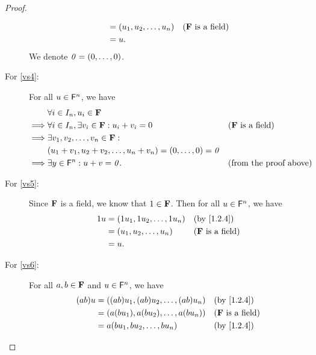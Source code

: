 \begin{proof}
\begin{description}
\begin{align*}
                                    & = {\left\lparen{u}_{1}, {u}_{2}, \dots, {u}_{n}\right\rparen}                                  &  & \text{(\(\mathbf{F}\) is a field)} \\
                                    & = u.
            \end{align*}
            We denote \(\mathit{0} = \left\lparen0, \dots, 0\right\rparen\).
        \item[For \ref{vs4}:]
            For all \(u \in \mathsf{F}^{n}\), we have
            \begin{align*}
                         & \forall i \in I_{n}, u_{i} \in \F                                                                                 \\
                \implies & \forall i \in I_{n}, \exists v_{i} \in \F : u_{i} + v_{i} = 0                  &  & \text{(\(\F\) is a field)}    \\
                \implies & \exists v_{1}, v_{2}, \dots, v_{n} \in \F :                                                                       \\
                         & \p{u_{1} + v_{1}, u_{2} + v_{2}, \dots, u_{n} + v_{n}} = \p{0, \dots, 0} = \zv                                    \\
                \implies & \exists y \in \vs{F}^{n} : u + v = \zv.                                        &  & \text{(from the proof above)}
            \end{align*}
        \item[For \ref{vs5}:]
            Since \(\mathbf{F}\) is a field, we know that \(1 \in \mathbf{F}\).
            Then for all \(u \in \mathsf{F}^{n}\), we have
            \begin{align*}
                1u & = \p{1 u_{1}, 1 u_{2}, \dots, 1 u_{n}} &  & \text{(by \cref{1.2.4})}   \\
                   & = \tp{u}{n}                            &  & \text{(\(\F\) is a field)} \\
                   & = u.
            \end{align*}
        \item[For \ref{vs6}:]
            For all \(a, b \in \mathbf{F}\) and \(u \in \mathsf{F}^{n}\), we have
            \begin{align*}
                \p{ab} u & = \p{\p{ab} u_{1}, \p{ab} u_{2}, \dots, \p{ab} u_{n}}    &  & \text{(by \cref{1.2.4})}   \\
                         & = \p{a \p{b u_{1}}, a \p{b u_{2}}, \dots, a \p{b u_{n}}} &  & \text{(\(\F\) is a field)} \\
                         & = a \p{b u_{1}, b u_{2}, \dots, b u_{n}}                 &  & \text{(by \cref{1.2.4})}   \\

\end{align*}
\end{description}
\end{proof}
